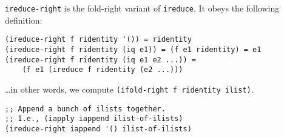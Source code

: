 \begin{entry}{%
  }

\texttt{ireduce-right} is the fold-right variant of
  \texttt{ireduce}. It obeys the following definition:

\begin{verbatim}
(ireduce-right f ridentity '()) = ridentity
(ireduce-right f ridentity (iq e1)) = (f e1 ridentity) = e1
(ireduce-right f ridentity (iq e1 e2 ...)) =
    (f e1 (ireduce f ridentity (e2 ...)))
\end{verbatim}

  \ldots{}in other words, we compute \texttt{(ifold-right\ f\
    ridentity\ ilist)}.

\begin{verbatim}
;; Append a bunch of ilists together.
;; I.e., (iapply iappend ilist-of-ilists)
(ireduce-right iappend '() ilist-of-ilists)
\end{verbatim}
\end{entry}

